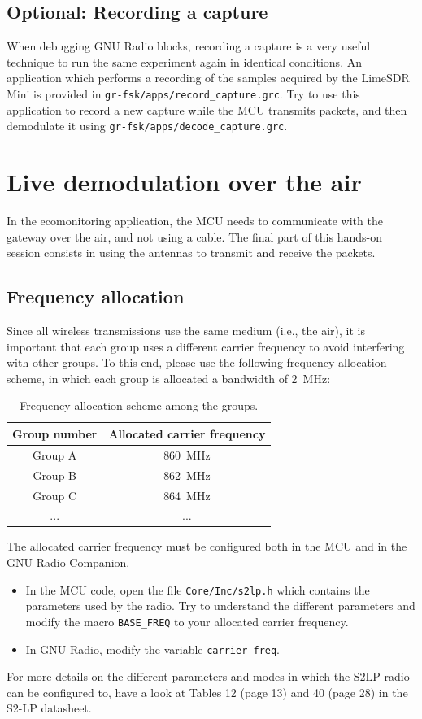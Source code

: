 \subsection{Optional: Recording a capture}

When debugging GNU Radio blocks, recording a capture is a very useful technique to run the same experiment again in identical conditions.
An application which performs a recording of the samples acquired by the LimeSDR Mini is provided in \texttt{gr-fsk/apps/record\_capture.grc}.
Try to use this application to record a new capture while the MCU transmits packets, and then demodulate it using \texttt{gr-fsk/apps/decode\_capture.grc}.

\section{Live demodulation over the air}

In the ecomonitoring application, the MCU needs to communicate with the gateway over the air, and not using a cable.
The final part of this hands-on session consists in using the antennas to transmit and receive the packets.

\subsection{Frequency allocation}

Since all wireless transmissions use the same medium (i.e., the air), it is important that each group uses a different carrier frequency to avoid interfering with other groups.
To this end, please use the following frequency allocation scheme, in which each group is allocated a bandwidth of \SI{2}{\mega\hertz}:
\begin{table}[h]
    \centering
    \begin{tabular}{c|c}
        Group number & Allocated carrier frequency\\
        \hline
        Group A & \SI{860}{\mega\hertz}\\
         Group B & \SI{862}{\mega\hertz}\\
         Group C & \SI{864}{\mega\hertz}\\
         ... & ...
    \end{tabular}
    \caption{Frequency allocation scheme among the groups.}
    \label{tab:freq_alloc}
\end{table}

The allocated carrier frequency must be configured both in the MCU and in the GNU Radio Companion.
\begin{itemize}
    \item In the MCU code, open the file \texttt{Core/Inc/s2lp.h} which contains the parameters used by the radio.
    Try to understand the different parameters and modify the macro \texttt{BASE\_FREQ} to your allocated carrier frequency.
    \item In GNU Radio, modify the variable \texttt{carrier\_freq}.
\end{itemize}
For more details on the different parameters and modes in which the S2LP radio can be configured to, have a look at Tables 12 (page 13) and 40 (page 28) in the S2-LP datasheet.

